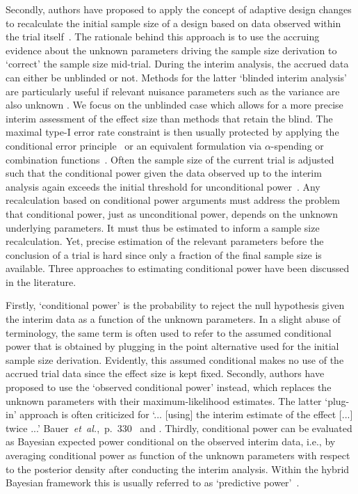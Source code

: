\documentclass[12pt]{article}
\begin{document}
Secondly, authors have proposed to apply the concept of adaptive design changes
to recalculate the initial sample size of a design based on data observed
within the trial itself~\cite{bauer2016}.
The rationale behind this approach is to use the accruing evidence about the unknown parameters driving the sample size derivation to
`correct' the sample size mid-trial.
During the interim analysis, the accrued data can either be unblinded
or not.
Methods for the latter `blinded interim analysis' are particularly useful if relevant nuisance parameters such as the variance are also unknown \cite{birkett1994internal,bauer2016}.
We focus on the unblinded case which allows for a more precise
interim assessment of the effect size than methods that retain
the blind.
The maximal type-I error rate constraint is then usually protected by
applying the conditional error principle~\cite{muller2004,brannath2012}
or an equivalent formulation via $\alpha$-spending or
combination functions~\cite{bauer2016}.
Often the sample size of the current
trial is adjusted such that the conditional power given the data observed up to the
interim analysis again exceeds the initial threshold for unconditional
power~\cite{proschan1995}.
Any recalculation based on conditional power arguments must
address the problem that conditional power,
just as unconditional power,
depends on the unknown underlying parameters.
It must thus be
estimated to inform a sample size recalculation.
Yet, precise estimation of the relevant parameters before the conclusion of a trial is hard since only a fraction of the final sample size is available.
Three approaches to estimating conditional power have been discussed in the literature.

Firstly,
`conditional power' is the probability to reject the null hypothesis given the interim data as a function of the unknown parameters.
In a slight abuse of terminology, the same term is often used to refer to
the assumed conditional power that is obtained by plugging in the
point alternative used for the initial sample size derivation.
Evidently, this assumed conditional makes no use of the accrued trial
data since the effect size is kept fixed.
Secondly,
authors have proposed to use the `observed conditional power' instead, which replaces the unknown parameters with their maximum-likelihood estimates.
The latter `plug-in' approach is often criticized for
`... [using] the interim estimate of the effect [...] twice ...' Bauer~\textit{et~al.},~p.~330~\cite{bauer2016} and \cite{bauer2006}.
Thirdly,
conditional power can be evaluated as Bayesian expected power conditional on the observed interim data,
i.e., by averaging conditional power as function of the unknown
parameters with respect to the posterior density
after conducting the interim analysis.
Within the hybrid Bayesian framework this is usually referred to as
`predictive power'~\cite{spiegelhalter1994,bauer2016}.
\end{document}
